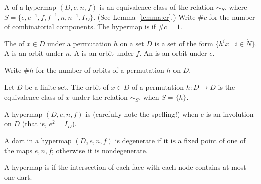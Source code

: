 \begin{definition}
A  of a hypermap $(D,e,n,f)$ is an 
equivalence class of the relation $\sim_S$, where
$S=\{e,e^{-1},f,f^{-1},n,n^{-1},I_D\}$. 
(See Lemma~\ref{lemma:er}.)  Write $\#c$ for the
number of combinatorial components.  The hypermap is  if
$\#c=1$.  %
%
%
%
%
\end{definition}





\begin{definition} The  of $x\in D$ under a permutation $h$ on
a set $D$ is a set of the form $\{h^i x\mid i\in\ring{N}\}$.  A 
is an orbit under $n$.  A  is an orbit under $f$.  
An  is an
orbit under $e$.  %
%
%
\end{definition}

Write $\#h$ for the
number of orbits of a permutation $h$ on $D$.  
%
%


\begin{lemma}
Let $D$ be a finite set.  The orbit of $x\in D$ of a permutation $h:D\to D$
is the equivalence class of $x$ under the relation $\sim_S$, when $S=\{h\}$.
\end{lemma}

\begin{definition}[plain] A hypermap $(D,e,n,f)$ is 
(carefully note the spelling!) when $e$ is an involution on $D$
(that is, $e^2 = I_D$).  
%
\end{definition}




\begin{definition}[degenerate] A dart in a hypermap $(D,e,n,f)$ 
is degenerate if it is a
fixed point of one of the maps $e,n,f$; otherwise it is nondegenerate.  
%
%
\end{definition}

\begin{definition}[simple] 
A hypermap is  if the intersection of each face with
each node contains at most one dart.  %
\end{definition}



